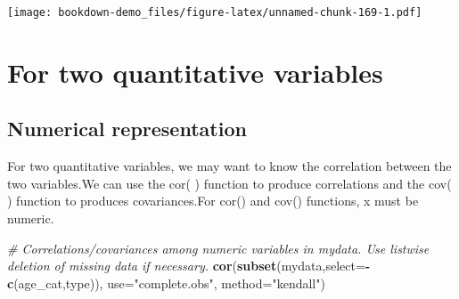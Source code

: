\documentclass[]{book}
\newenvironment{Shaded}{\begin{snugshade}}{\end{snugshade}}
\newcommand{\KeywordTok}[1]{\textcolor[rgb]{0.13,0.29,0.53}{\textbf{#1}}}
\newcommand{\DataTypeTok}[1]{\textcolor[rgb]{0.13,0.29,0.53}{#1}}
\newcommand{\DecValTok}[1]{\textcolor[rgb]{0.00,0.00,0.81}{#1}}
\newcommand{\StringTok}[1]{\textcolor[rgb]{0.31,0.60,0.02}{#1}}
\newcommand{\CommentTok}[1]{\textcolor[rgb]{0.56,0.35,0.01}{\textit{#1}}}
\newcommand{\OperatorTok}[1]{\textcolor[rgb]{0.81,0.36,0.00}{\textbf{#1}}}
\newcommand{\NormalTok}[1]{#1}
\theoremstyle{definition}
\theoremstyle{definition}
\theoremstyle{definition}
\theoremstyle{remark}
\begin{document}
\begin{Shaded}
\end{Shaded}

\texttt{[image: bookdown-demo\_files/figure-latex/unnamed-chunk-169-1.pdf]}

\section{For two quantitative
variables}\label{for-two-quantitative-variables}

\subsection{Numerical representation}\label{numerical-representation-2}

For two quantitative variables, we may want to know the correlation
between the two variables.We can use the cor( ) function to produce
correlations and the cov( ) function to produces covariances.For cor()
and cov() functions, x must be numeric.

\begin{Shaded}
\begin{Highlighting}[]
\CommentTok{# Correlations/covariances among numeric variables in  mydata. Use listwise deletion of missing data if necessary. }
\KeywordTok{cor}\NormalTok{(}\KeywordTok{subset}\NormalTok{(mydata,}\DataTypeTok{select=}\OperatorTok{-}\KeywordTok{c}\NormalTok{(age_cat,type)), }\DataTypeTok{use=}\StringTok{"complete.obs"}\NormalTok{, }\DataTypeTok{method=}\StringTok{"kendall"}\NormalTok{) }
\end{Highlighting}
\end{Shaded}
\end{document}
